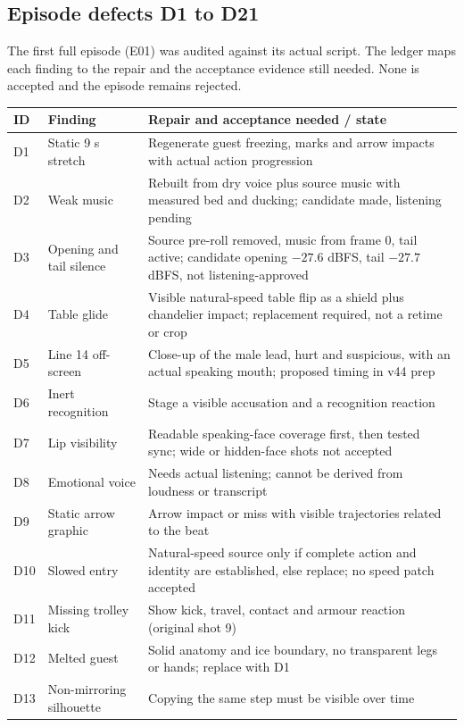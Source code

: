 \documentclass[11pt,a4paper]{article}
\begin{document}
\subsection{Episode defects D1 to D21}
The first full episode (E01) was audited against its actual script. The ledger maps each finding to the repair and the acceptance evidence still needed. None is accepted and the episode remains rejected.
\begin{longtable}{@{}P{1.6cm}P{5.6cm}P{8.3cm}@{}}
\toprule \textbf{ID} & \textbf{Finding} & \textbf{Repair and acceptance needed / state}\\ \midrule\endhead
D1 & Static 9 s stretch & Regenerate guest freezing, marks and arrow impacts with actual action progression\\
D2 & Weak music & Rebuilt from dry voice plus source music with measured bed and ducking; candidate made, listening pending\\
D3 & Opening and tail silence & Source pre-roll removed, music from frame 0, tail active; candidate opening $-27.6$ dBFS, tail $-27.7$ dBFS, not listening-approved\\
D4 & Table glide & Visible natural-speed table flip as a shield plus chandelier impact; replacement required, not a retime or crop\\
D5 & Line 14 off-screen & Close-up of the male lead, hurt and suspicious, with an actual speaking mouth; proposed timing in v44 prep\\
D6 & Inert recognition & Stage a visible accusation and a recognition reaction\\
D7 & Lip visibility & Readable speaking-face coverage first, then tested sync; wide or hidden-face shots not accepted\\
D8 & Emotional voice & Needs actual listening; cannot be derived from loudness or transcript\\
D9 & Static arrow graphic & Arrow impact or miss with visible trajectories related to the beat\\
D10 & Slowed entry & Natural-speed source only if complete action and identity are established, else replace; no speed patch accepted\\
D11 & Missing trolley kick & Show kick, travel, contact and armour reaction (original shot 9)\\
D12 & Melted guest & Solid anatomy and ice boundary, no transparent legs or hands; replace with D1\\
D13 & Non-mirroring silhouette & Copying the same step must be visible over time\\

\end{longtable}
\end{document}
